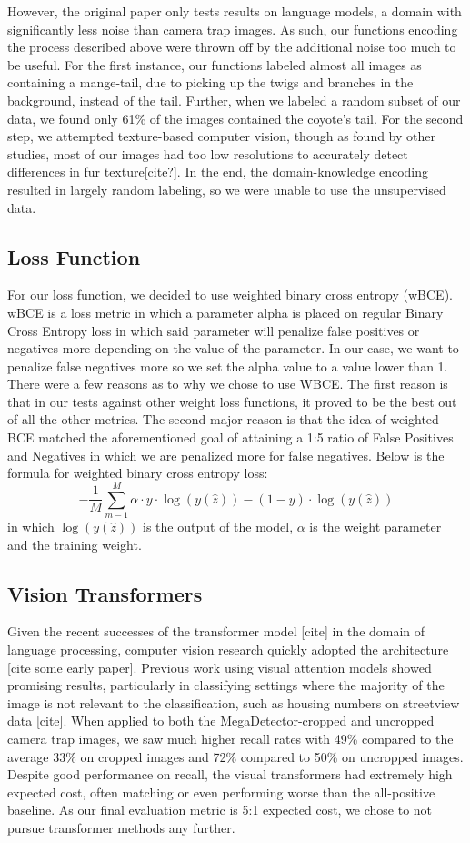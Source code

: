 \documentclass{article}
\begin{document}
However, the original paper only tests results on language models, a domain with
significantly less noise than camera trap images. As such, our functions
encoding the process described above were thrown off by the additional noise too
much to be useful. For the first instance, our functions labeled almost all
images as containing a mange-tail, due to picking up the twigs and branches in
the background, instead of the tail. Further, when we labeled a random subset of
our data, we found only 61\% of the images contained the coyote’s tail. For the
second step, we attempted texture-based computer vision, though as found by
other studies, most of our images had too low resolutions to accurately detect
differences in fur texture[cite?]. In the end, the domain-knowledge encoding
resulted in largely random labeling, so we were unable to use the unsupervised
data.

\subsection{Loss Function}

For our loss function, we decided to use weighted binary cross entropy (wBCE).
wBCE is a loss metric in which a parameter alpha is placed on  regular Binary
Cross Entropy loss in which said parameter will penalize false positives or
negatives more depending on the value of the parameter. In our case, we want to
penalize false negatives more so we set the alpha value to a value lower than 1.
There were a few reasons as to why we chose to use WBCE. The first reason is
that in our tests against other weight loss functions, it proved to be the best
out of all the other metrics. The second major reason is that the idea of
weighted BCE matched the aforementioned goal of attaining a 1:5 ratio of False
Positives and Negatives in which we are penalized more for false negatives.
Below is the formula for weighted binary cross entropy loss:
\[
-\frac{1}{M}\sum_{m-1}^{M}\alpha \cdot y \cdot \log(y(\hat{z}))-(1-y)\cdot\log(y(\hat{z}))
\]
in which $\log(y(\hat{z}))$ is the output of the model, $\alpha$ is the weight
parameter and the training weight.


\subsection{Vision Transformers}
Given the recent successes of the transformer model [cite] in the domain of
language processing, computer vision research quickly adopted the architecture
[cite some early paper].  Previous work using visual attention models showed
promising results, particularly in classifying settings where the majority of
the image is not relevant to the classification, such as housing numbers on
streetview data [cite]. When applied to both the MegaDetector-cropped and
uncropped camera trap images, we saw much higher recall rates with 49\% compared
to the average 33\% on cropped images and 72\% compared to 50\% on uncropped
images. Despite good performance on recall, the visual transformers had
extremely high expected cost, often matching or even performing worse than the
all-positive baseline. As our final evaluation metric is 5:1 expected cost, we
chose to not pursue transformer methods any further.
\end{document}
